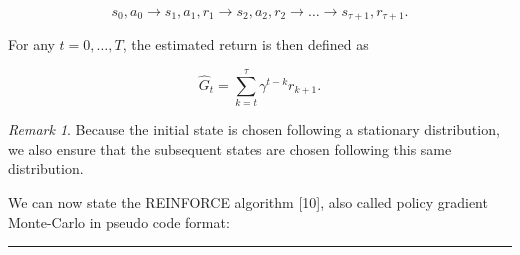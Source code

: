 \documentclass[
  letterpaper,
]{report}
\theoremstyle{plain}
\theoremstyle{definition}
\theoremstyle{definition}
\theoremstyle{remark}
\newtheorem*{remark}{Remark}
\begin{document}
\[
s_0,a_0 \to s_1,a_1,r_1 \to s_2,a_2,r_2 \to \dots \to s_{\tau +1}, r_{\tau +1}.
\]

For any \(t = 0,\dots ,T\), the estimated return is then defined as

\[
\hat{G}_t = \sum_{k=t}^\tau \gamma^{t-k}r_{k+1}.
\]

\begin{remark}

Because the initial state is chosen following a stationary distribution,
we also ensure that the subsequent states are chosen following this same
distribution.

\end{remark}

We can now state the REINFORCE algorithm {[}10{]}, also called policy
gradient Monte-Carlo in pseudo code format:

\begin{center}\rule{0.5\linewidth}{0.5pt}\end{center}
\end{document}

